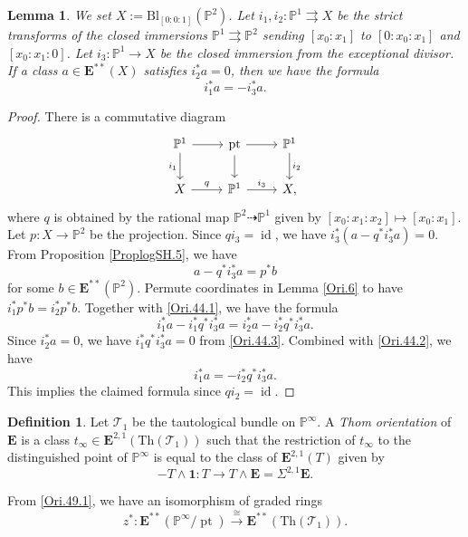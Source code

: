 \documentclass[11pt, a4paper]{amsart}
\newtheorem{lem}[thm]{Lemma}
\theoremstyle{definition}
\newtheorem{df}[thm]{Definition}
\numberwithin{equation}{subsection}
\renewcommand{\P}{\mathbb{P}}
\newcommand{\id}{\operatorname{id}}   			%
\newcommand{\pt}[1]{\mathrm{\pt}_{#1}}
\newcommand{\Blow}{{\mathrm{Bl}}}
\newcommand{\Thom}{\mathrm{Th}}
\newcommand{\cT}{\mathcal{T}}
\def\pt{\operatorname{pt}}
\newcommand{\unit}{\mathbf{1}}
\newcommand{\ringE}{\mathbf{E}}
\begin{document}
\begin{lem}
\label{Ori.44}
We set $X:=\Blow_{[0:0:1]}(\P^2)$.
Let $i_1,i_2\colon \P^1\rightrightarrows X$ be the strict transforms of the closed immersions $\P^1\rightrightarrows \P^2$ sending $[x_0:x_1]$ to $[0:x_0:x_1]$ and $[x_0:x_1:0]$.
Let $i_3\colon \P^1\to X$ be the closed immersion from the exceptional divisor.
If a class $a\in \ringE^{**}(X)$ satisfies $i_2^*a=0$, then we have the formula
\[
i_1^*a=-i_3^*a.
\]
\end{lem}
\begin{proof}
There is a commutative diagram
\begin{equation}
\label{Ori.44.3}
\begin{tikzcd}
\P^1\ar[d,"i_1"']\ar[r]&
\pt\ar[d]\ar[r]&
\P^1\ar[d,"i_2"]
\\
X\ar[r,"q"]&
\P^1\ar[r,"i_3"]&
X,
\end{tikzcd}
\end{equation}
where $q$ is
obtained by the rational map $\P^2\dashrightarrow \P^1$ given by $[x_0:x_1:x_2]\mapsto [x_0:x_1]$.
Let $p\colon X\to \P^2$ be the projection.
Since $qi_3=\id$, we have $i_3^*(a-q^*i_3^*a)=0$.
From Proposition \ref{ProplogSH.5}, we have
\begin{equation}
\label{Ori.44.1}
a-q^*i_3^*a=p^*b
\end{equation}
for some $b\in \ringE^{**}(\P^2)$.
Permute coordinates in Lemma \ref{Ori.6} to have $i_1^*p^*b=i_2^*p^*b$.
Together with \eqref{Ori.44.1}, we have the formula
\begin{equation}
\label{Ori.44.2}
i_1^*a-i_1^*q^*i_3^*a=i_2^*a-i_2^*q^*i_3^*a.
\end{equation}
Since $i_2^*a=0$, we have $i_1^*q^*i_3^*a=0$ from \eqref{Ori.44.3}.
Combined with \eqref{Ori.44.2}, we have
\[
i_1^*a=-i_2^*q^*i_3^*a.
\]
This implies the claimed formula since $qi_2=\id$.
\end{proof}





\begin{df}
Let $\cT_1$ be the tautological bundle on $\P^\infty$.
A \emph{Thom orientation}  of $\ringE$ is a class $t_\infty \in \ringE^{2,1}(\Thom(\cT_1))$ such that the restriction of $t_\infty$ to the distinguished point of $\P^\infty$ is equal to the class of $\ringE^{2,1}(T)$ given by
\[
-T\wedge \unit
\colon
T \to T\wedge \ringE = \Sigma^{2,1}\ringE.
\]
\end{df}

From \eqref{Ori.49.1}, we have an isomorphism of graded rings
\begin{equation}
\label{Ori.49.2}
z^*
\colon
\ringE^{**}(\P^\infty/\pt)
\xrightarrow{\cong}
\ringE^{**}(\Thom(\cT_1)).
\end{equation}
\end{document}

